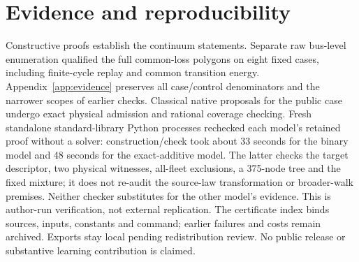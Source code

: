 \documentclass[11pt]{article}
\theoremstyle{definition}\newtheorem{definition}[theorem]{Definition}
\theoremstyle{remark}\newtheorem{remark}[theorem]{Remark}
\begin{document}
\section*{Evidence and reproducibility}
Constructive proofs establish the continuum statements. Separate raw
bus-level enumeration qualified the full common-loss polygons on eight fixed
cases, including finite-cycle replay and common transition energy.
Appendix~\ref{app:evidence} preserves all case/control denominators and the
narrower scopes of earlier checks. Classical native proposals for the public
case undergo exact physical admission and rational coverage checking.
Fresh standalone standard-library Python processes rechecked each model's
retained proof without a solver: construction/check took about 33 seconds
for the binary model and 48 seconds for the exact-additive model.
The latter checks the target descriptor, two physical witnesses, all-fleet
exclusions, a 375-node tree and the fixed mixture; it does not re-audit the
source-law transformation or broader-walk premises. Neither checker
substitutes for the other model's evidence. This is author-run verification,
not external replication. The certificate index binds sources, inputs,
constants and command; earlier failures and costs remain archived.
Exports stay local pending redistribution review. No public release or
substantive learning contribution is claimed.

\clearpage
\appendix
















\clearpage
\LossyProjectionProofs




\TransitionEnergyProofs






\end{document}
